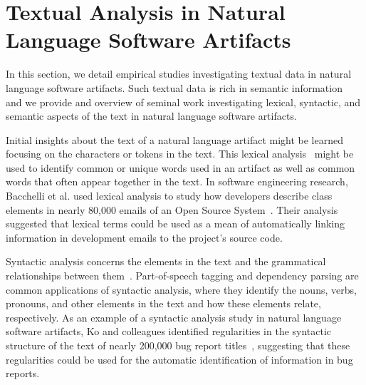 



\section{Textual Analysis in Natural Language Software Artifacts}
\label{cp2:text-in-se}



In this section, we detail empirical studies investigating 
textual data in natural language software artifacts. 
Such textual data is  rich in semantic information~\cite{dekhtyar2004} 
and we provide and overview of seminal work 
investigating lexical, syntactic, and semantic aspects of the text 
in natural language software artifacts.




Initial insights about the text of a natural language artifact might be learned focusing on 
the characters or tokens in the text.
This lexical analysis~\cite{jurafsky2014speech} might be used to identify common or unique words 
used in an artifact as well as common words that often appear together  in the text. In software engineering research, Bacchelli et al. used lexical analysis to study how developers describe class elements
in nearly 80,000 emails of an Open Source System~\cite{bacchelli2009}.
Their analysis suggested that lexical terms could be 
used as a mean of automatically linking information in development emails to 
the project's source code.







Syntactic analysis concerns the  elements in the text 
and the grammatical relationships between them~\cite{jurafsky2014speech}. 
Part-of-speech tagging and dependency parsing are common applications of syntactic analysis,
where they identify the nouns, verbs, pronouns, and other elements in the text 
and how these elements relate, respectively. 
As an example of a syntactic analysis study in natural language software artifacts, 
Ko and colleagues identified regularities in the syntactic structure of the text 
of nearly 200,000 bug report titles~\cite{Ko2006}, suggesting that these 
regularities could be used for the automatic identification 
of information in bug reports. 




